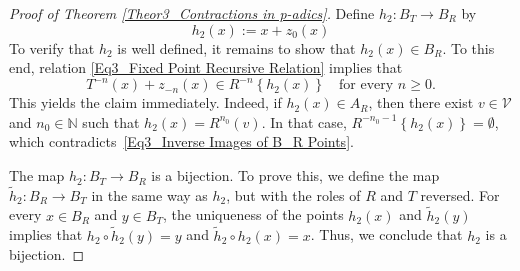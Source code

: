 \documentclass[10pt,a4paper]{amsart}
\begin{document}
\begin{proof}[Proof of Theorem \ref{Theor3_Contractions in p-adics}]
		Define $h_{2}: B_{T} \to B_{R}$ by  
		\begin{equation}\label{Eq2_Conjugation Fundamental Domain B}
			h_{2} \left(  x  \right)  :=   x + z_{0} \left(  x  \right)  
		\end{equation}
		To verify that $h_{2}$ is well defined, it remains to show that $h_{2} \left(  x  \right)  \in B_{R}$. To this end, relation \eqref{Eq3_Fixed Point Recursive Relation} implies that 
		\begin{equation}\label{Eq3_Inverse Images of B_R Points}
			T^{-n} \left(  x  \right)  + z_{-n} \left(  x  \right)    \in   R^{-n} \left\{  h_{2}  \left(  x  \right)   \right\}  \quad \text{for every } n \ge 0 .
		\end{equation} 
		This yields the claim immediately. Indeed, if $ h_{2}(x) \in A_{R}$, then there exist $v \in \mathcal{V}$ and $n_{0} \in \mathbb{N} $ such that $ h_{2}(x) = R^{n_{0}}(v)$. 
		In that case, $R^{-n_{0} -1 } \left\{   h_{2}(x)  \right\}  = \emptyset$, which contradicts~\eqref{Eq3_Inverse Images of B_R Points}. 
		
		
		
		
		The map $h_{2}: B_{T} \to B_{R}$ is a bijection. To prove this, we define the map $\tilde{h}_{2}: B_{R} \to B_{T}$ in the same way as $h_{2}$, but with the roles of $R$ and $T$ reversed. 
		For every $x \in B_{R}$ and $y \in B_{T}$, the uniqueness of the points $h_{2} \left(  x  \right) $ and $\tilde{h}_{2} \left(  y  \right) $ implies that  $h_{2} \circ \tilde{h}_{2} \left(  y  \right)  = y$ and $\tilde{h}_{2} \circ h_{2} \left(  x  \right)   = x$. Thus, we conclude that $h_{2}$ is a bijection. 
		

\end{proof}
\end{document}

